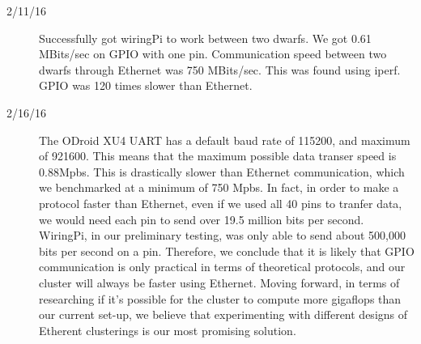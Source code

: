 \begin{description}
\item [2/11/16] Successfully got wiringPi to work between two dwarfs. We got 0.61 MBits/sec on GPIO with one pin. Communication speed between two dwarfs through Ethernet was 750 MBits/sec. This was found using iperf. GPIO was 120 times slower than Ethernet.

\item [2/16/16] The ODroid XU4 UART has a default baud rate of 115200, and maximum of 921600. This means that the maximum possible data transer speed is 0.88Mpbs. This is drastically slower than Ethernet communication, which we benchmarked at a minimum of 750 Mpbs. In fact, in order to make a protocol faster than Ethernet, even if we used all 40 pins to tranfer data, we would need each pin to send over 19.5 million bits per second. WiringPi, in our preliminary testing, was only able to send about 500,000 bits per second on a pin. Therefore, we conclude that it is likely that GPIO communication is only practical in terms of theoretical protocols, and our cluster will always be faster using Ethernet. Moving forward, in terms of researching if it's possible for the cluster to compute more gigaflops than our current set-up, we believe that experimenting with different designs of Etherent clusterings is our most promising solution.
\end{description}

